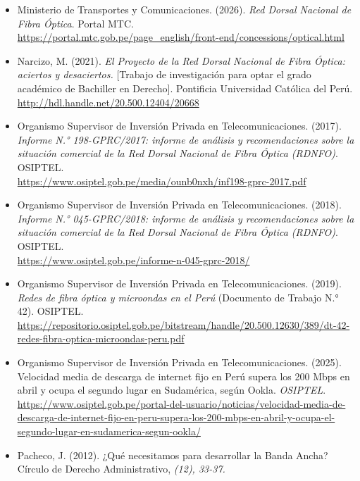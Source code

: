\begin{itemize}[leftmargin=1.27cm, itemindent=-1.27cm, label={}, itemsep=12pt, parsep=0pt]
\item Ministerio de Transportes y Comunicaciones. (2026). \textit{Red Dorsal Nacional de Fibra Óptica}. Portal MTC.\\
\url{https://portal.mtc.gob.pe/page_english/front-end/concessions/optical.html}

\item Narcizo, M. (2021). \textit{El Proyecto de la Red Dorsal Nacional de Fibra Óptica: aciertos y desaciertos.} [Trabajo de investigación para optar el grado académico de Bachiller en Derecho]. Pontificia Universidad Católica del Perú.\\
\url{http://hdl.handle.net/20.500.12404/20668}

\item Organismo Supervisor de Inversión Privada en Telecomunicaciones. (2017). \textit{Informe N.° 198-GPRC/2017: informe de análisis y recomendaciones sobre la situación comercial de la Red Dorsal Nacional de Fibra Óptica (RDNFO)}. OSIPTEL.\\
\url{https://www.osiptel.gob.pe/media/ounb0nxh/inf198-gprc-2017.pdf}

\item Organismo Supervisor de Inversión Privada en Telecomunicaciones. (2018). \textit{Informe N.° 045-GPRC/2018: informe de análisis y recomendaciones sobre la situación comercial de la Red Dorsal Nacional de Fibra Óptica (RDNFO)}. OSIPTEL.\\
\url{https://www.osiptel.gob.pe/informe-n-045-gprc-2018/}

\item Organismo Supervisor de Inversión Privada en Telecomunicaciones. (2019). \textit{Redes de fibra óptica y microondas en el Perú} (Documento de Trabajo N.° 42). OSIPTEL.\\
\url{https://repositorio.osiptel.gob.pe/bitstream/handle/20.500.12630/389/dt-42-redes-fibra-optica-microondas-peru.pdf}

\item Organismo Supervisor de Inversión Privada en Telecomunicaciones. (2025). Velocidad media de descarga de internet fijo en Perú supera los 200 Mbps en abril y ocupa el segundo lugar en Sudamérica, según Ookla. \textit{OSIPTEL}.\\
\url{https://www.osiptel.gob.pe/portal-del-usuario/noticias/velocidad-media-de-descarga-de-internet-fijo-en-peru-supera-los-200-mbps-en-abril-y-ocupa-el-segundo-lugar-en-sudamerica-segun-ookla/}

\item Pacheco, J. (2012). ¿Qué necesitamos para desarrollar la Banda Ancha? Círculo de Derecho Administrativo, \textit{(12), 33-37.}\\


\end{itemize}
